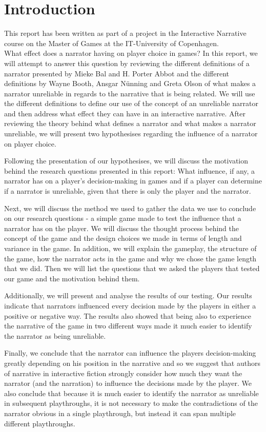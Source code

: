 \section{Introduction}
\label{Introduction}

This report has been written as part of a project in the Interactive Narrative course on the Master of Games at the IT-University of Copenhagen.\\

What effect does a narrator having on player choice in games? In this report, we will attempt to answer this question by reviewing the different definitions of a narrator presented by Mieke Bal and H. Porter Abbot and the different definitions by Wayne Booth, Ansgar N\"unning and Greta Olson of what makes a narrator unreliable in regards to the narrative that is being related. We will use the different definitions to define our use of the concept of an unreliable narrator and then address what effect they can have in an interactive narrative. After reviewing the theory behind what defines a narrator and what makes a narrator unreliable, we will present two hypothesises regarding the influence of a narrator on player choice.

Following the presentation of our hypothesises, we will discuss the motivation behind the research questions presented in this report: What influence, if any, a narrator has on a player's decision-making in games and if a player can determine if a narrator is unreliable, given that there is only the player and the narrator. 

Next, we will discuss the method we used to gather the data we use to conclude on our research questions - a simple game made to test the influence that a narrator has on the player. We will discuss the thought process behind the concept of the game and the design choices we made in terms of length and variance in the game. In addition, we will explain the gameplay, the structure of the game, how the narrator acts in the game and why we chose the game length that we did. Then we will list the questions that we asked the players that tested our game and the motivation behind them.

Additionally, we will present and analyse the results of our testing. Our results indicate that narrators influenced every decision made by the players in either a positive or negative way. The results also showed that being also to experience the narrative of the game in two different ways made it much easier to identify the narrator as being unreliable.

Finally, we conclude that the narrator can influence the players decision-making greatly depending on his position in the narrative and so we suggest that authors of narrative in interactive fiction strongly consider how much they want the narrator (and the narration) to influence the decisions made by the player. We also conclude that because it is much easier to identify the narrator as unreliable in subsequent playthroughs, it is not necessary to make the contradictions of the narrator obvious in a single playthrough, but instead it can span multiple different playthroughs.